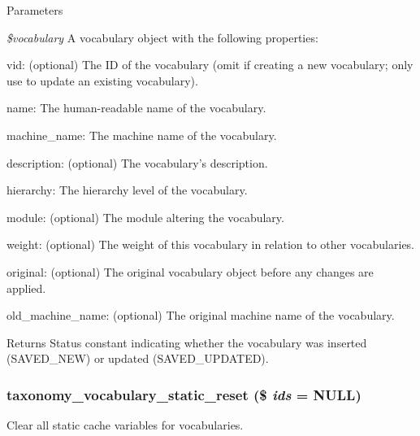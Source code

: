 \begin{DoxyParams}{Parameters}
\item[{\em \$vocabulary}]A vocabulary object with the following properties:
\begin{DoxyItemize}
\item vid: (optional) The ID of the vocabulary (omit if creating a new vocabulary; only use to update an existing vocabulary).
\item name: The human-\/readable name of the vocabulary.
\item machine\_\-name: The machine name of the vocabulary.
\item description: (optional) The vocabulary's description.
\item hierarchy: The hierarchy level of the vocabulary.
\item module: (optional) The module altering the vocabulary.
\item weight: (optional) The weight of this vocabulary in relation to other vocabularies.
\item original: (optional) The original vocabulary object before any changes are applied.
\item old\_\-machine\_\-name: (optional) The original machine name of the vocabulary.
\end{DoxyItemize}\end{DoxyParams}
\begin{DoxyReturn}{Returns}
Status constant indicating whether the vocabulary was inserted (SAVED\_\-NEW) or updated (SAVED\_\-UPDATED). 
\end{DoxyReturn}
\hypertarget{taxonomy_8module_a2f2ec1faf8c08ba104875d78649dc114}{
\subsubsection[{taxonomy\_\-vocabulary\_\-static\_\-reset}]{\setlength{\rightskip}{0pt plus 5cm}taxonomy\_\-vocabulary\_\-static\_\-reset (\$ {\em ids} = {\ttfamily NULL})}}
\label{taxonomy_8module_a2f2ec1faf8c08ba104875d78649dc114}
Clear all static cache variables for vocabularies.


